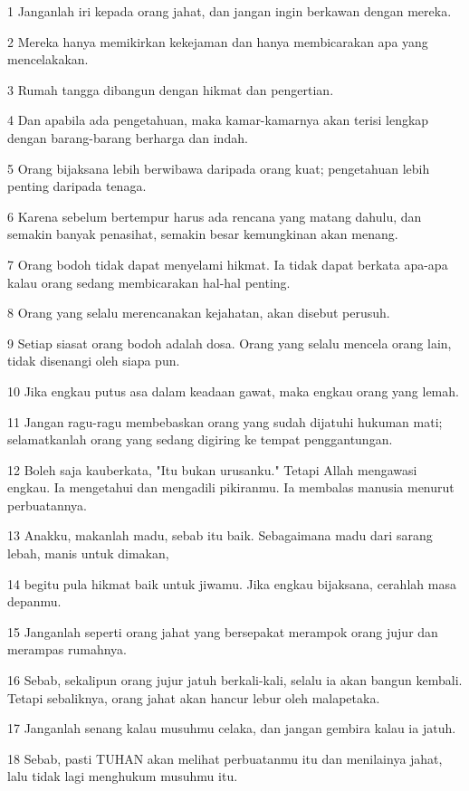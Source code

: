 \par 1 Janganlah iri kepada orang jahat, dan jangan ingin berkawan dengan mereka.
\par 2 Mereka hanya memikirkan kekejaman dan hanya membicarakan apa yang mencelakakan.
\par 3 Rumah tangga dibangun dengan hikmat dan pengertian.
\par 4 Dan apabila ada pengetahuan, maka kamar-kamarnya akan terisi lengkap dengan barang-barang berharga dan indah.
\par 5 Orang bijaksana lebih berwibawa daripada orang kuat; pengetahuan lebih penting daripada tenaga.
\par 6 Karena sebelum bertempur harus ada rencana yang matang dahulu, dan semakin banyak penasihat, semakin besar kemungkinan akan menang.
\par 7 Orang bodoh tidak dapat menyelami hikmat. Ia tidak dapat berkata apa-apa kalau orang sedang membicarakan hal-hal penting.
\par 8 Orang yang selalu merencanakan kejahatan, akan disebut perusuh.
\par 9 Setiap siasat orang bodoh adalah dosa. Orang yang selalu mencela orang lain, tidak disenangi oleh siapa pun.
\par 10 Jika engkau putus asa dalam keadaan gawat, maka engkau orang yang lemah.
\par 11 Jangan ragu-ragu membebaskan orang yang sudah dijatuhi hukuman mati; selamatkanlah orang yang sedang digiring ke tempat penggantungan.
\par 12 Boleh saja kauberkata, "Itu bukan urusanku." Tetapi Allah mengawasi engkau. Ia mengetahui dan mengadili pikiranmu. Ia membalas manusia menurut perbuatannya.
\par 13 Anakku, makanlah madu, sebab itu baik. Sebagaimana madu dari sarang lebah, manis untuk dimakan,
\par 14 begitu pula hikmat baik untuk jiwamu. Jika engkau bijaksana, cerahlah masa depanmu.
\par 15 Janganlah seperti orang jahat yang bersepakat merampok orang jujur dan merampas rumahnya.
\par 16 Sebab, sekalipun orang jujur jatuh berkali-kali, selalu ia akan bangun kembali. Tetapi sebaliknya, orang jahat akan hancur lebur oleh malapetaka.
\par 17 Janganlah senang kalau musuhmu celaka, dan jangan gembira kalau ia jatuh.
\par 18 Sebab, pasti TUHAN akan melihat perbuatanmu itu dan menilainya jahat, lalu tidak lagi menghukum musuhmu itu.
